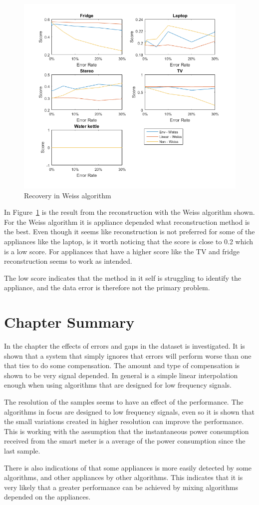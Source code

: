 \newpage
\begin{figure}[H]
\centering
\includegraphics[width=1\textwidth]{billeder/Rec-Weiss.png}
\caption{Recovery in Weiss algorithm}
\label{fig:ERWEISS}
\end{figure}

In Figure~\ref{fig:ERWEISS} is the result from the reconstruction with the Weiss algorithm shown. For the Weiss algorithm it is appliance depended what reconstruction method is the best. Even though it seems like reconstruction is not preferred for some of the appliances like the laptop, is it worth noticing that the score is close to 0.2 which is a low score. For appliances that have a higher score like the TV and fridge reconstruction seems to work as intended.

The low score indicates that the method in it self is struggling to identify the appliance, and the data error is therefore not the primary problem.  

\section{Chapter Summary}
In the chapter the effects of errors and gaps in the dataset is investigated. It is shown that a system that simply ignores that errors will perform worse than one that ties to do some compensation. The amount and type of compensation is shown to be very signal depended. In general is a simple linear interpolation enough when using algorithms that are designed for low frequency signals. 

The resolution of the samples seems to have an effect of the performance. The algorithms in focus are designed to low frequency signals, even so it is shown that the small variations created in higher resolution can improve the performance. This is working with the assumption that the instantaneous power consumption received from the smart meter is a average of the power consumption since the last sample. 

There is also indications of that some appliances is more easily detected by some algorithms, and other appliances by other algorithms. This indicates that it is very likely that a greater performance can be achieved by mixing algorithms depended on the appliances. 